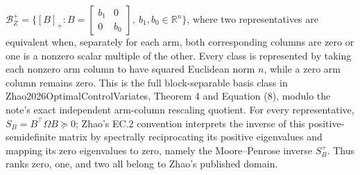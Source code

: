 \(\mathcal B_Z^+=\{[B]_+:B=\begin{bmatrix}b_1&0\\0&b_0\end{bmatrix},\ b_1,b_0\in\mathbb R^n\}\), where two representatives are equivalent when, separately for each arm, both corresponding columns are zero or one is a nonzero scalar multiple of the other.  Every class is represented by taking each nonzero arm column to have squared Euclidean norm \(n\), while a zero arm column remains zero.  This is the full block-separable basis class in Zhao2026OptimalControlVariates, Theorem 4 and Equation (8), modulo the note's exact independent arm-column rescaling quotient.  For every representative, \(S_B=B^{\top}\Omega B\succeq0\); Zhao's EC.2 convention interprets the inverse of this positive-semidefinite matrix by spectrally reciprocating its positive eigenvalues and mapping its zero eigenvalues to zero, namely the Moore--Penrose inverse \(S_B^+\).  Thus ranks zero, one, and two all belong to Zhao's published domain.